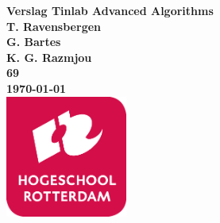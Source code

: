 \documentclass{article}
\begin{document}
	\sffamily
	\begin{titlepage}
		\centering
		\vfill
		{\bfseries\Huge
			Verslag Tinlab Advanced Algorithms \\
			\vskip2cm
		}
		{\bfseries\Large
			T. Ravensbergen\\ 
			G. Bartes\\
			K. G. Razmjou\\
		}
		{
			\bfseries\normalsize
			69\\
			\vskip1cm
			\today\\
		}    
		\vfill
		\includegraphics[width=4cm]{logohr.png} %
		\vfill
		\vfill
	\end{titlepage}
	\newpage
	\tableofcontents
	

	
	
	
	\cleardoublepage
	


	
	
	\cleardoublepage
	
		
	\cleardoublepage
	
	
	
	\cleardoublepage
	
	\appendix
	\begin{appendices}
		
	\end{appendices}
	
 
	
	\newpage
	
	
\end{document}

